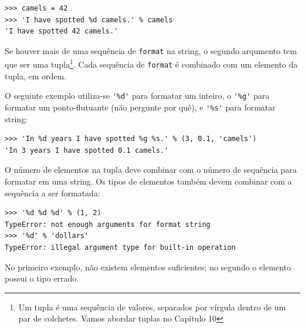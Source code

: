 {\beforeverb
\begin{verbatim}
>>> camels = 42
>>> 'I have spotted %d camels.' % camels
'I have spotted 42 camels.'
\end{verbatim}
\afterverb
%
%
Se houver mais de uma sequência de {\tt format} na string, o segundo arqumento
tem que ser uma tupla\footnote{Um tupla é uma sequência de valores, separados
	por vírgula dentro de um par de colchetes. Vamos abordar tuplas no
	Capítulo 10}. Cada sequência de {\tt format} é combinado com um elemento
da tupla, em ordem.


O seguinte exemplo utiliza-se \verb"'%d'" para formatar um inteiro, o
\verb"'%g'" para formatar um ponto-flutuante (não pergunte por quê), e
\verb"'%s'" para formatar string:

\beforeverb
\begin{verbatim}
>>> 'In %d years I have spotted %g %s.' % (3, 0.1, 'camels')
'In 3 years I have spotted 0.1 camels.'
\end{verbatim}
\afterverb
%
%
O número de elementos na tupla deve combinar com o número de sequência
para formatar em uma string. Os tipos de elementos também devem combinar
com a sequência a ser formatada:


\beforeverb
\begin{verbatim}
>>> '%d %d %d' % (1, 2)
TypeError: not enough arguments for format string
>>> '%d' % 'dollars'
TypeError: illegal argument type for built-in operation
\end{verbatim}
\afterverb
%
%
No primeiro exemplo, não existem elementos suficientes; no segundo o elemento
possui o tipo errado.


}
